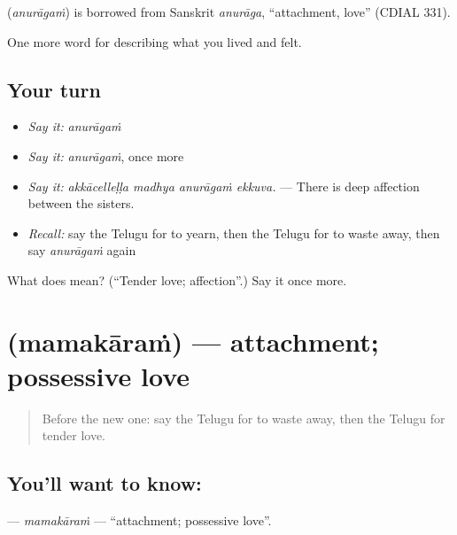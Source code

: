 \begin{cousinweb}
\textbf{} (\emph{anurāgaṁ}) is borrowed from Sanskrit \emph{anurāga}, \textquotedblleft{}attachment, love\textquotedblright{} (CDIAL 331).
\end{cousinweb}

\begin{grammarlens}[title={What you've built}]
One more word for describing what you lived and felt.
\end{grammarlens}

\subsection*{Your turn}
\begin{itemize}
\raggedright
  \item \emph{Say it:} \emph{anurāgaṁ}
  \item \emph{Say it:} \emph{anurāgaṁ}, once more
  \item \emph{Say it:} \emph{akkācelleḷḷa madhya anurāgaṁ ekkuva.} — There is deep affection between the sisters.
  \item \emph{Recall:} say the Telugu for to yearn, then the Telugu for to waste away, then say \emph{anurāgaṁ} again
\end{itemize}

\begin{tcolorbox}[breakable,colback=teal!4,colframe=teal!35!black,title={Before you move on}]
What does  mean? (\textquotedblleft{}Tender love; affection\textquotedblright{}.) Say it once more.
\end{tcolorbox}
\section[\texorpdfstring{\te{మమకారం} (mamakāraṁ)}{మమకారం (mamakāraṁ)}]{ (mamakāraṁ) — attachment; possessive love}

\label{lesson:TE-C503-mamakaram}



\begin{quote}
Before the new one: say the Telugu for to waste away, then the Telugu for tender love.
\end{quote}

\subsection*{You'll want to know: }
\textbf{} — \emph{mamakāraṁ} — \textquotedblleft{}attachment; possessive love\textquotedblright{}.

